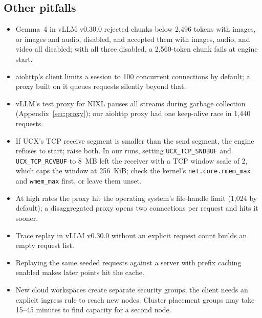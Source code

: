 \documentclass[11pt]{article}
\begin{document}
\subsection{Other pitfalls}
\begin{itemize}
  \item Gemma~4 in vLLM v0.30.0 rejected chunks below 2,496 tokens with images, or images and audio, disabled, and accepted them with images, audio, and video all disabled; with all three disabled, a 2,560-token chunk fails at engine start.
  \item aiohttp's client limits a session to 100 concurrent connections by default; a proxy built on it queues requests silently beyond that.
  \item vLLM's test proxy for NIXL pauses all streams during garbage collection (Appendix~\ref{sec:proxy}); our aiohttp proxy had one keep-alive race in 1,440 requests.
  \item If UCX's TCP receive segment is smaller than the send segment, the engine refuses to start; raise both. In our runs, setting \texttt{UCX\_TCP\_SNDBUF} and \texttt{UCX\_TCP\_RCVBUF} to 8~MB left the receiver with a TCP window scale of 2, which caps the window at 256~KiB; check the kernel's \texttt{net.core.rmem\_max} and \texttt{wmem\_max} first, or leave them unset.
  \item At high rates the proxy hit the operating system's file-handle limit (1,024 by default); a disaggregated proxy opens two connections per request and hits it sooner.
  \item Trace replay in vLLM v0.30.0 without an explicit request count builds an empty request list.
  \item Replaying the same seeded requests against a server with prefix caching enabled makes later points hit the cache.
  \item New cloud workspaces create separate security groups; the client needs an explicit ingress rule to reach new nodes. Cluster placement groups may take 15--45 minutes to find capacity for a second node.
\end{itemize}
\end{document}
